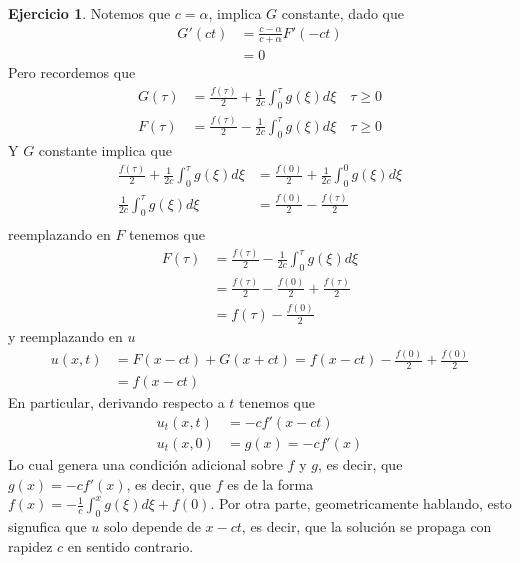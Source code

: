 \documentclass{article}
\theoremstyle{plain}
\theoremstyle{definition}
\newtheorem{ex}[proposición]{Ejercicio}
\begin{document}
\begin{ex}
Notemos que $c = \alpha$, implica $G$ constante, dado que
\begin{align*}
    G'(ct) &= \frac{c -\alpha}{c + \alpha }F'(-ct)\\
    &= 0
\end{align*}
Pero recordemos que
\begin{align*}
    G(\tau) &= \frac{f(\tau)}{2} + \frac{1}{2c} \int_{0}^{\tau} g(\xi) d\xi \quad \tau \geq 0\\
    F(\tau) &= \frac{f(\tau)}{2} - \frac{1}{2c} \int_{0}^{\tau} g(\xi) d\xi \quad \tau \geq 0
\end{align*}
Y $G$ constante implica que
\begin{align*}
    \frac{f(\tau)}{2} + \frac{1}{2c} \int_{0}^{\tau} g(\xi) d\xi &= \frac{f(0)}{2} + \frac{1}{2c} \int_{0}^{0} g(\xi) d\xi\\
    \frac{1}{2c} \int_{0}^{\tau} g(\xi) d\xi &= \frac{f(0)}{2} -\frac{f(\tau)}{2}\\
\end{align*}
reemplazando en $F$ tenemos que
\begin{align*}
    F(\tau) &= \frac{f(\tau)}{2} - \frac{1}{2c} \int_{0}^{\tau} g(\xi) d\xi\\
    &= \frac{f(\tau)}{2} - \frac{f(0)}{2} + \frac{f(\tau)}{2}\\
    &= f(\tau) - \frac{f(0)}{2}
\end{align*}
y reemplazando en $u$
\begin{align*}
    u(x,t) &= F(x - ct) + G(x + ct) = f(x - ct) - \frac{f(0)}{2} + \frac{f(0)}{2}\\
    &= f(x - ct)
\end{align*}
En particular, derivando respecto a $t$ tenemos que
\begin{align*}
    u_t(x,t) &= -cf'(x - ct)\\
    u_t(x,0) &= g(x) = -cf'(x)
\end{align*}
Lo cual genera una condición adicional sobre $f$ y $g$, es decir, que $g(x) = -cf'(x)$, es decir, que $f$ es de la forma $f(x) = -\frac{1}{c} \int_{0}^{x} g(\xi) d\xi + f(0)$. Por otra parte, geometricamente hablando, esto signufica que $u$ solo depende de $x - ct$, es decir, que la solución se propaga con rapidez $c$ en sentido contrario.
\end{ex}
\end{document}
